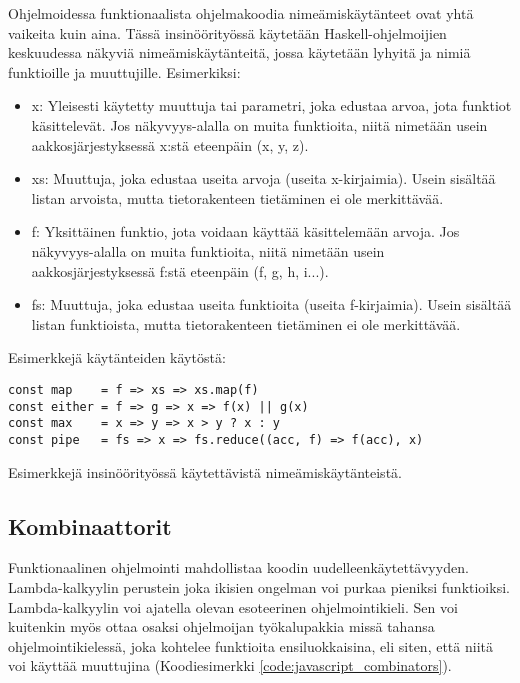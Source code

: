 Ohjelmoidessa funktionaalista ohjelmakoodia nimeämiskäytänteet ovat yhtä vaikeita kuin aina. Tässä insinöörityössä käytetään Haskell-ohjelmoijien keskuudessa näkyviä nimeämiskäytänteitä, jossa käytetään lyhyitä ja  nimiä funktioille ja muuttujille. Esimerkiksi:

\begin{itemize}
    \item x: Yleisesti käytetty muuttuja tai parametri, joka edustaa arvoa, jota funktiot käsittelevät. Jos näkyvyys-alalla on muita funktioita, niitä nimetään usein aakkosjärjestyksessä x:stä eteenpäin (x, y, z).
    \item xs: Muuttuja, joka edustaa useita arvoja (useita x-kirjaimia). Usein sisältää listan arvoista, mutta tietorakenteen tietäminen ei ole merkittävää.
    \item f: Yksittäinen funktio, jota voidaan käyttää käsittelemään arvoja. Jos näkyvyys-alalla on muita funktioita, niitä nimetään usein aakkosjärjestyksessä f:stä eteenpäin (f, g, h, i...).
    \item fs: Muuttuja, joka edustaa useita funktioita (useita f-kirjaimia). Usein sisältää listan funktioista, mutta tietorakenteen tietäminen ei ole merkittävää.
\end{itemize}

Esimerkkejä käytänteiden käytöstä:

\begin{code}
    \begin{verbatim}
const map    = f => xs => xs.map(f)
const either = f => g => x => f(x) || g(x)
const max    = x => y => x > y ? x : y
const pipe   = fs => x => fs.reduce((acc, f) => f(acc), x)
\end{verbatim}
    \caption{Esimerkkejä insinöörityössä käytettävistä nimeämiskäytänteistä.}
    \label{code:javascript_naming_convention_example}
\end{code}

\subsection{Kombinaattorit}


Funktionaalinen ohjelmointi mahdollistaa koodin uudelleenkäytettävyyden. Lambda-kalkyylin perustein joka ikisien ongelman voi purkaa pieniksi funktioiksi. \citep{BlellochHarper2015} Lambda-kalkyylin voi ajatella olevan esoteerinen ohjelmointikieli. Sen voi kuitenkin myös ottaa osaksi ohjelmoijan työkalupakkia missä tahansa ohjelmointikielessä, joka kohtelee funktioita ensiluokkaisina, eli siten, että niitä voi käyttää muuttujina (Koodiesimerkki \ref{code:javascript_combinators}).

